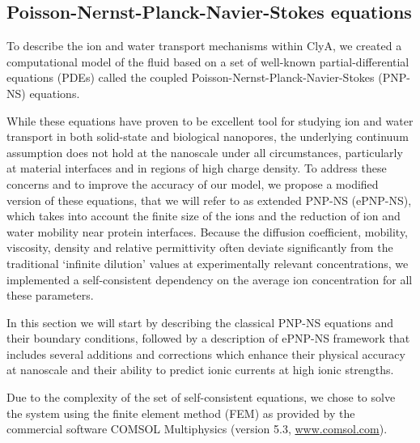 \documentclass[journal=ancac3, manuscript=article, etalmode=truncate,maxauthors=0]{achemso}
\begin{document}




\subsection{Poisson-Nernst-Planck-Navier-Stokes equations}
To describe the ion and water transport mechanisms within ClyA, we created a computational model of the fluid
based on a set of well-known partial-differential equations (PDEs) called the coupled
Poisson-Nernst-Planck-Navier-Stokes (PNP-NS) equations. 

While these equations have proven to be excellent tool for studying ion and water transport in both 
solid-state\cite{daiguji2004,lu2012,chaudhry2014,rempfer2016,lin2016} and biological 
nanopores,\cite{eisenberg1996,simakov2010,pederson2015} the underlying continuum assumption does not hold at 
the nanoscale under all circumstances, particularly at material interfaces\cite{vo2016} and in regions of 
high charge density.\cite{corry2000} To address these concerns and to improve the accuracy of our model, we 
propose a modified version of these equations, that we will refer to as extended PNP-NS (ePNP-NS), which takes
into account the finite size of the ions\cite{borukhov1997,lu2011} and the reduction of ion and water mobility
near protein interfaces.\cite{makarov1998, pronk2013} Because the diffusion coefficient, mobility, viscosity,
density\cite{} and relative permittivity\cite{gavish2016} often deviate significantly from the traditional
`infinite dilution' values at experimentally relevant concentrations, we implemented a self-consistent
dependency on the average ion concentration for all these parameters.

In this section we will start by describing the classical PNP-NS equations and their boundary conditions,
followed by a description of ePNP-NS framework that includes several additions and corrections which enhance
their physical accuracy at nanoscale and their ability to predict ionic currents at high ionic strengths.

Due to the complexity of the set of self-consistent equations, we chose to solve the system using the finite
element method (FEM) as provided by the commercial software COMSOL Multiphysics (version 5.3,
\href{www.comsol.com}{www.comsol.com}).
\end{document}

